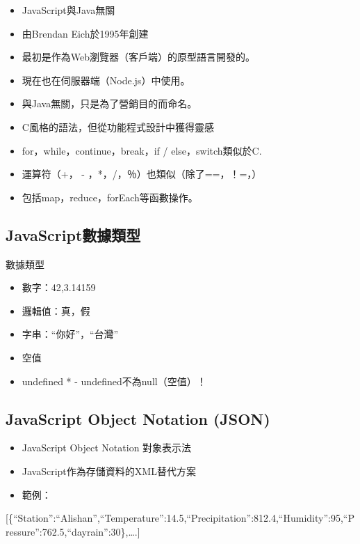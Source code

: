 \documentclass[]{book}
\providecommand{\tightlist}{%
  \setlength{\itemsep}{0pt}\setlength{\parskip}{0pt}}
\begin{document}
\begin{itemize}
\tightlist
\item
  JavaScript與Java無關
\item
  由Brendan Eich於1995年創建
\item
  最初是作為Web瀏覽器（客戶端）的原型語言開發的。
\item
  現在也在伺服器端（Node.js）中使用。
\item
  與Java無關，只是為了營銷目的而命名。
\item
  C風格的語法，但從功能程式設計中獲得靈感
\item
  for，while，continue，break，if / else，switch類似於C.
\item
  運算符（+， - ，*，/，％）也類似（除了==，！=，\textbar\textbar）
\item
  包括map，reduce，forEach等函數操作。
\end{itemize}

\hypertarget{javascript-2}{%
\subsection{JavaScript數據類型}\label{javascript-2}}

數據類型

\begin{itemize}
\tightlist
\item
  數字：42,3.14159
\item
  邏輯值：真，假
\item
  字串：``你好''，``台灣''
\item
  空值
\item
  undefined * - undefined不為null（空值）！
\end{itemize}

\hypertarget{javascript-object-notation-json}{%
\subsection{JavaScript Object Notation (JSON)}\label{javascript-object-notation-json}}

\begin{itemize}
\tightlist
\item
  JavaScript Object Notation 對象表示法
\item
  JavaScript作為存儲資料的XML替代方案
\item
  範例：
\end{itemize}

{[}\{``Station'':``Alishan'',``Temperature'':14.5,``Precipitation'':812.4,``Humidity'':95,``Pressure'':762.5,``dayrain'':30\},\ldots.{]}
\end{document}
